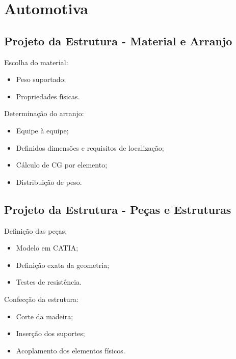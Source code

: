 \documentclass{beamer}
\begin{document}
\section{Automotiva}
\subsection{Projeto da Estrutura - Material e Arranjo}
\begin{frame}
  Escolha do material:
    \begin{itemize}
        \item Peso suportado;
        \item Propriedades físicas.
    \end{itemize}
    Determinação do arranjo:
    \begin{itemize}
        \item Equipe à equipe;
        \item Definidos dimensões e requisitos de localização;
        \item Cálculo de CG por elemento;
        \item Distribuição de peso.
    \end{itemize}
\end{frame}

\subsection{Projeto da Estrutura - Peças e Estruturas}
\begin{frame}
Definição das peças:
    \begin{itemize}
        \item Modelo em CATIA;
        \item Definição exata da geometria;
        \item Testes de resistência.
    \end{itemize}
    Confecção da estrutura:
    \begin{itemize}
        \item Corte da madeira;
        \item Inserção dos suportes;
        \item Acoplamento dos elementos físicos.
    \end{itemize}
\end{frame}
\end{document}
